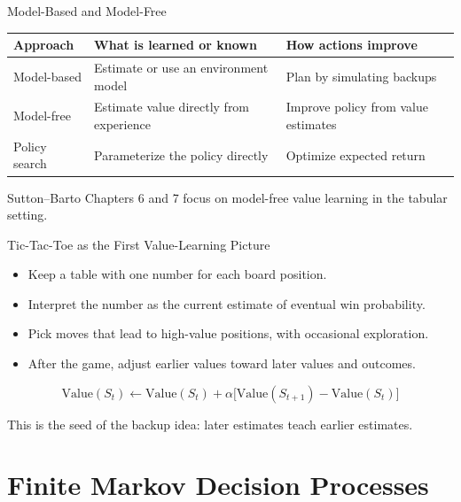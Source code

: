 \documentclass[aspectratio=169]{beamer}
\begin{document}
\begin{frame}{Model-Based and Model-Free}
\small
\begin{tabular}{>{\raggedright\arraybackslash}p{}
                >{\raggedright\arraybackslash}p{}
                >{\raggedright\arraybackslash}p{}}
\toprule
Approach & What is learned or known & How actions improve \\
\midrule
Model-based & Estimate or use an environment model & Plan by simulating backups \\
Model-free & Estimate value directly from experience & Improve policy from value estimates \\
Policy search & Parameterize the policy directly & Optimize expected return \\
\bottomrule
\end{tabular}

\vspace{1em}
Sutton--Barto Chapters 6 and 7 focus on model-free value learning in the tabular setting.
\end{frame}

\begin{frame}{Tic-Tac-Toe as the First Value-Learning Picture}
\small
\begin{itemize}
    \item Keep a table with one number for each board position.
    \item Interpret the number as the current estimate of eventual win probability.
    \item Pick moves that lead to high-value positions, with occasional exploration.
    \item After the game, adjust earlier values toward later values and outcomes.
\end{itemize}

\vspace{0.7em}
\[
\text{Value}(S_t) \leftarrow
\text{Value}(S_t)+\alpha\bigl[\text{Value}(S_{t+1})-\text{Value}(S_t)\bigr]
\]

\vspace{0.4em}
This is the seed of the backup idea: later estimates teach earlier estimates.
\end{frame}

\section{Finite Markov Decision Processes}
\end{document}
